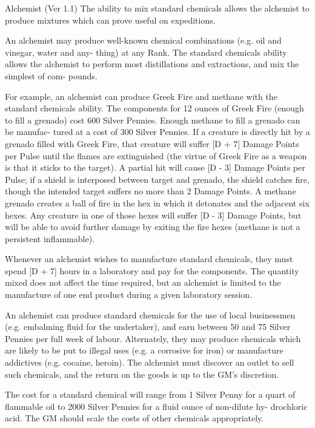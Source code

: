 \begin{Chapter}{Alchemist (Ver 1.1)}
The ability to mix standard chemicals allows the 
alchemist to produce mixtures which can prove 
useful on expeditions. 

An  alchemist  may  produce  well-known  chemical 
combinations (e.g. oil and vinegar, water and any-
thing) at any Rank. The standard chemicals ability 
allows  the  alchemist  to  perform  most  distillations 
and  extractions,  and  mix  the  simplest  of  com-
pounds. 

For example, an alchemist can produce Greek Fire 
and  methane  with  the  standard  chemicals  ability. 
The  components  for  12  ounces  of  Greek  Fire 
(enough to fill a grenado) cost 600 Silver Pennies. 
Enough methane to fill a grenado can be manufac-
tured at a cost of 300 Silver Pennies. If a creature is 
directly  hit  by  a  grenado  filled  with  Greek  Fire, 
that creature will suffer [D + 7] Damage Points per 
Pulse  until  the  flames  are  extinguished  (the  virtue 
of  Greek  Fire  as  a  weapon  is  that  it  sticks  to  the 
target).  A  partial  hit  will  cause  [D  -  3]  Damage 
Points  per  Pulse;  if  a  shield  is  interposed  between 
target  and  grenado,  the  shield  catches  fire,  though 
the intended target suffers no more than 2 Damage 
Points. A methane grenado creates a ball of fire in 
the  hex  in  which  it  detonates  and  the  adjacent  six 
hexes.  Any  creature  in  one  of  those  hexes  will 
suffer  [D  -  3]  Damage  Points,  but  will  be  able  to 
avoid  further  damage  by  exiting  the  fire  hexes 
(methane is not a persistent inflammable). 

Whenever  an  alchemist  wishes  to  manufacture 
standard chemicals, they must spend [D + 7] hours 
in  a  laboratory  and  pay  for  the  components.  The 
quantity  mixed  does  not  affect  the  time  required, 
but  an  alchemist  is  limited  to  the  manufacture  of 
one end product during a given laboratory session. 

An  alchemist  can  produce  standard  chemicals  for 
the use of local businessmen (e.g. embalming fluid 
for  the  undertaker),  and  earn  between  50  and  75 
Silver Pennies per full week of labour. Alternately, 
they may produce chemicals which are likely to be 
put  to  illegal  uses  (e.g.  a  corrosive  for  iron)  or 
manufacture  addictives  (e.g.  cocaine,  heroin).  The 
alchemist  must  discover  an  outlet  to  sell  such 
chemicals, and the return on the goods is up to the 
GM’s discretion. 

The cost for a standard chemical will range from 1 
Silver  Penny  for  a  quart  of  flammable  oil  to  2000 
Silver  Pennies  for  a  fluid  ounce  of  non-dilute  hy-
drochloric  acid.  The  GM  should scale  the  costs  of 
other chemicals appropriately. 


\end{Chapter}
